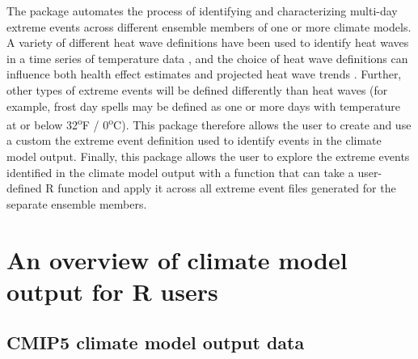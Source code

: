 The  package automates the process of identifying
and characterizing multi-day extreme events across different ensemble
members of one or more climate models. A variety of different heat wave
definitions have been used to identify heat waves in a time series of
temperature data \citep{smith2013heat}, and the choice of heat wave
definitions can influence both health effect estimates
\citep{chen2015influence, kent2014heat} and projected heat wave trends
\citep{smith2013heat}. Further, other types of extreme events will be
defined differently than heat waves (for example, frost day spells may
be defined as one or more days with temperature at or below
32\textsuperscript{o}F / 0\textsuperscript{o}C). This package therefore
allows the user to create and use a custom the extreme event definition
used to identify events in the climate model output. Finally, this
package allows the user to explore the extreme events identified in the
climate model output with a function that can take a user-defined R
function and apply it across all extreme event files generated for the
separate ensemble members.

\section{An overview of climate model output for R
users}\label{an-overview-of-climate-model-output-for-r-users}

\subsection{CMIP5 climate model output
data}\label{cmip5-climate-model-output-data}

